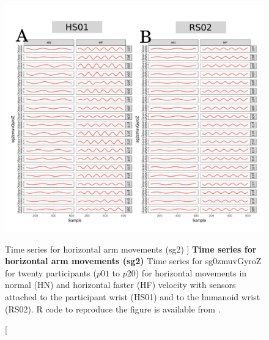 \begin{figure}
\centering
\includegraphics[width=1.0\textwidth]{aH-sg2}
    	\caption
	[Time series for horizontal arm movements (sg2) ]{
	{\bf Time series for horizontal arm movements (sg2)}
		Time series for sg0zmuvGyroZ for twenty participants 
		($p01$ to  $p20$) 
		for horizontal movements in normal (HN) and horizontal faster (HF) 
		velocity with sensors attached to the participant wrist (HS01)
		and to the humanoid wrist (RS02).
	R code to reproduce the figure is available from \cite{hwum2018}.
        }
    \label{fig:aH-sg2}
\end{figure}





